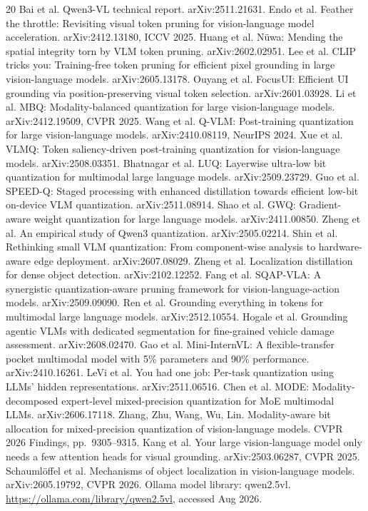 \documentclass{article}
\begin{document}
\begin{thebibliography}{20}\small
{} Bai et al. Qwen3-VL technical report. arXiv:2511.21631.
 Endo et al. Feather the throttle: Revisiting visual token pruning for vision-language model acceleration. arXiv:2412.13180, ICCV 2025.
 Huang et al. N\"uwa: Mending the spatial integrity torn by VLM token pruning. arXiv:2602.02951.
 Lee et al. CLIP tricks you: Training-free token pruning for efficient pixel grounding in large vision-language models. arXiv:2605.13178.
 Ouyang et al. FocusUI: Efficient UI grounding via position-preserving visual token selection. arXiv:2601.03928.
 Li et al. MBQ: Modality-balanced quantization for large vision-language models. arXiv:2412.19509, CVPR 2025.
 Wang et al. Q-VLM: Post-training quantization for large vision-language models. arXiv:2410.08119, NeurIPS 2024.
 Xue et al. VLMQ: Token saliency-driven post-training quantization for vision-language models. arXiv:2508.03351.
 Bhatnagar et al. LUQ: Layerwise ultra-low bit quantization for multimodal large language models. arXiv:2509.23729.
 Guo et al. SPEED-Q: Staged processing with enhanced distillation towards efficient low-bit on-device VLM quantization. arXiv:2511.08914.
 Shao et al. GWQ: Gradient-aware weight quantization for large language models. arXiv:2411.00850.
 Zheng et al. An empirical study of Qwen3 quantization. arXiv:2505.02214.
 Shin et al. Rethinking small VLM quantization: From component-wise analysis to hardware-aware edge deployment. arXiv:2607.08029.
 Zheng et al. Localization distillation for dense object detection. arXiv:2102.12252.
 Fang et al. SQAP-VLA: A synergistic quantization-aware pruning framework for vision-language-action models. arXiv:2509.09090.
 Ren et al. Grounding everything in tokens for multimodal large language models. arXiv:2512.10554.
 Hogale et al. Grounding agentic VLMs with dedicated segmentation for fine-grained vehicle damage assessment. arXiv:2608.02470.
 Gao et al. Mini-InternVL: A flexible-transfer pocket multimodal model with 5\% parameters and 90\% performance. arXiv:2410.16261.
 LeVi et al. You had one job: Per-task quantization using LLMs' hidden representations. arXiv:2511.06516.
 Chen et al. MODE: Modality-decomposed expert-level mixed-precision quantization for MoE multimodal LLMs. arXiv:2606.17118.
 Zhang, Zhu, Wang, Wu, Lin. Modality-aware bit allocation for mixed-precision quantization of vision-language models. CVPR 2026 Findings, pp.\ 9305--9315.
 Kang et al. Your large vision-language model only needs a few attention heads for visual grounding. arXiv:2503.06287, CVPR 2025.
 Schauml\"offel et al. Mechanisms of object localization in vision-language models. arXiv:2605.19792, CVPR 2026.
 Ollama model library: qwen2.5vl. \url{https://ollama.com/library/qwen2.5vl}, accessed Aug 2026.
\end{thebibliography}
\end{document}
